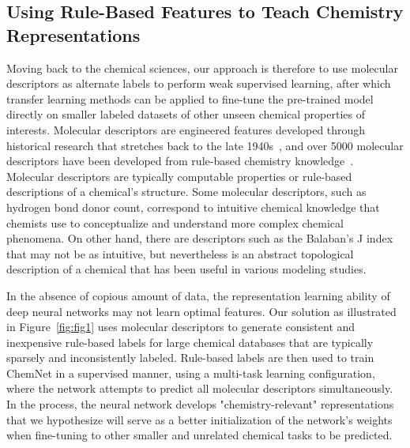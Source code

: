 \documentclass[sigconf]{acmart}
\begin{document}
\subsection{Using Rule-Based Features to Teach Chemistry Representations}
Moving back to the chemical sciences, our approach is therefore to use molecular descriptors as alternate labels to perform weak supervised learning, after which transfer learning methods can be applied to fine-tune the pre-trained model directly on smaller labeled datasets of other unseen chemical properties of interests. Molecular descriptors are engineered features developed through historical research that stretches back to the late 1940s~\cite{platt1947}, and over 5000 molecular descriptors have been developed from rule-based chemistry knowledge~\cite{todeschini2008}. Molecular descriptors are typically computable properties or rule-based descriptions of a chemical's structure. Some molecular descriptors, such as hydrogen bond donor count, correspond to intuitive chemical knowledge that chemists use to conceptualize and understand more complex chemical phenomena. On other hand, there are descriptors such as the Balaban's J index~\cite{balaban1982} that may not be as intuitive, but nevertheless is an abstract topological description of a chemical that has been useful in various modeling studies.

In the absence of copious amount of data, the representation learning ability of deep neural networks may not learn optimal features. Our solution as illustrated in Figure~\ref{fig:fig1} uses molecular descriptors to generate consistent and inexpensive rule-based labels for large chemical databases that are typically sparsely and inconsistently labeled. Rule-based labels are then used to train ChemNet in a supervised manner, using a multi-task learning configuration, where the network attempts to predict all molecular descriptors simultaneously. In the process, the neural network develops "chemistry-relevant" representations that we hypothesize will serve as a better initialization of the network's weights when fine-tuning to other smaller and unrelated chemical tasks to be predicted.
\end{document}
